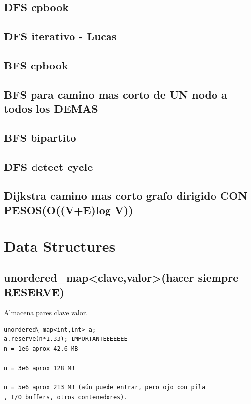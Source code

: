 \subsection{DFS cpbook}
\raggedbottom
\hrulefill
\subsection{DFS iterativo - Lucas}
\raggedbottom
\hrulefill
\subsection{BFS cpbook}
\raggedbottom
\hrulefill

\subsection{BFS para camino mas corto de UN nodo a todos los DEMAS}
\raggedbottom
\hrulefill

\subsection{BFS bipartito}
\raggedbottom
\hrulefill

\subsection{DFS detect cycle}
\raggedbottom
\hrulefill

\subsection{Dijkstra camino mas corto grafo dirigido CON PESOS(O((V+E)log V))}
\raggedbottom
\hrulefill
\section{Data Structures}
\subsection{unordered\_map\textless clave,valor\textgreater (hacer siempre RESERVE)}
Almacena pares clave valor.
\begin{verbatim}
unordered\_map<int,int> a;
a.reserve(n*1.33); IMPORTANTEEEEEEE
n = 1e6 aprox 42.6 MB

n = 3e6 aprox 128 MB

n = 5e6 aprox 213 MB (aún puede entrar, pero ojo con pila
, I/O buffers, otros contenedores).
\end{verbatim}

